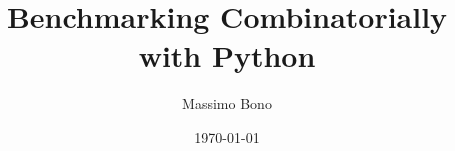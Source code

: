 \documentclass[usenames,dvipsnames]{beamer}
\title{Benchmarking Combinatorially with Python}
\author{Massimo Bono}
\institute{Università degli Studi di Brescia}
\date{\today}
\begin{document}
    \beamertemplatenavigationsymbolsempty

% 





\end{document}

